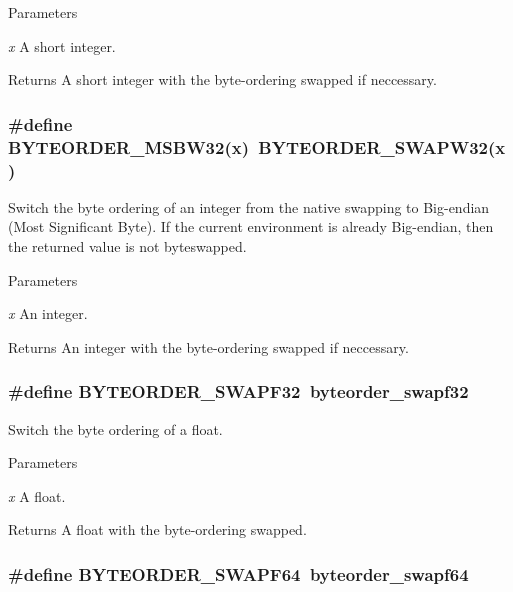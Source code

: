 \begin{DoxyParams}{Parameters}
\item[{\em x}]A short integer. \end{DoxyParams}
\begin{DoxyReturn}{Returns}
A short integer with the byte-\/ordering swapped if neccessary. 
\end{DoxyReturn}
\hypertarget{group__byteorder_ga46ff7133babdbfa8166fbdb4d40d72a7}{
\subsubsection[{BYTEORDER\_\-MSBW32}]{\setlength{\rightskip}{0pt plus 5cm}\#define BYTEORDER\_\-MSBW32(x)~BYTEORDER\_\-SWAPW32(x)}}
\label{group__byteorder_ga46ff7133babdbfa8166fbdb4d40d72a7}


Switch the byte ordering of an integer from the native swapping to Big-\/endian (Most Significant Byte). If the current environment is already Big-\/endian, then the returned value is not byteswapped.


\begin{DoxyParams}{Parameters}
\item[{\em x}]An integer. \end{DoxyParams}
\begin{DoxyReturn}{Returns}
An integer with the byte-\/ordering swapped if neccessary. 
\end{DoxyReturn}
\hypertarget{group__byteorder_ga78c51e5ecacde07ac8f68c1dc7bca801}{
\subsubsection[{BYTEORDER\_\-SWAPF32}]{\setlength{\rightskip}{0pt plus 5cm}\#define BYTEORDER\_\-SWAPF32~byteorder\_\-swapf32}}
\label{group__byteorder_ga78c51e5ecacde07ac8f68c1dc7bca801}


Switch the byte ordering of a float. 
\begin{DoxyParams}{Parameters}
\item[{\em x}]A float. \end{DoxyParams}
\begin{DoxyReturn}{Returns}
A float with the byte-\/ordering swapped. 
\end{DoxyReturn}
\hypertarget{group__byteorder_ga9e36111d85cc708026b869111af4d084}{
\subsubsection[{BYTEORDER\_\-SWAPF64}]{\setlength{\rightskip}{0pt plus 5cm}\#define BYTEORDER\_\-SWAPF64~byteorder\_\-swapf64}}
\label{group__byteorder_ga9e36111d85cc708026b869111af4d084}


